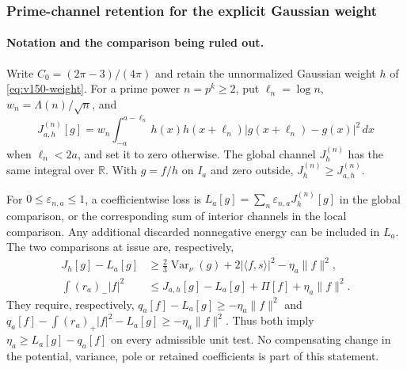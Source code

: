 \documentclass[11pt]{article}
\theoremstyle{remark}
\begin{document}
\subsubsection*{Prime-channel retention for the explicit Gaussian weight}


\paragraph{Notation and the comparison being ruled out.}
Write $C_0=(2\pi-3)/(4\pi)$ and retain the unnormalized Gaussian weight
$h$ of \eqref{eq:v150-weight}. For a prime power $n=p^k\ge2$, put
$\ell_n=\log n$, $w_n=\Lambda(n)/\sqrt n$, and
\[
 J^{(n)}_{a,h}[g]
 =w_n\int_{-a}^{a-\ell_n}h(x)h(x+\ell_n)
                 |g(x+\ell_n)-g(x)|^2\,dx
\]
when $\ell_n<2a$, and set it to zero otherwise. The global channel
$J^{(n)}_h$ has the same integral over $\mathbb R$. With $g=f/h$ on
$I_a$ and zero outside, $J^{(n)}_h\ge J^{(n)}_{a,h}$.

For $0\le\varepsilon_{n,a}\le1$, a coefficientwise loss is
$L_a[g]=\sum_n\varepsilon_{n,a}J^{(n)}_h[g]$ in the global comparison,
or the corresponding sum of interior channels in the local comparison.
Any additional discarded nonnegative energy can be included in $L_a$.
The two comparisons at issue are, respectively,
\begin{align*}
 J_h[g]-L_a[g]&\ge\tfrac23\operatorname{Var}_\nu(g)
       +2|\langle f,s\rangle|^2-\eta_a\|f\|^2,\\
 \int(r_a)_-|f|^2&\le J_{a,h}[g]-L_a[g]+\Pi[f]
                                  +\eta_a\|f\|^2.
\end{align*}
They require, respectively, $q_a[f]-L_a[g]\ge-\eta_a\|f\|^2$
and $q_a[f]-\int(r_a)_+|f|^2-L_a[g]\ge-\eta_a\|f\|^2$.
Thus both imply $\eta_a\ge L_a[g]-q_a[f]$ on every admissible unit test.
No compensating change in the potential, variance, pole or retained
coefficients is part of this statement.
\end{document}
